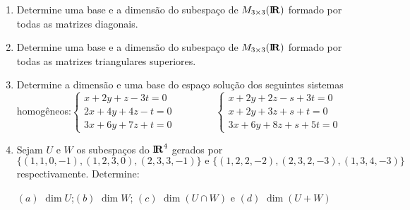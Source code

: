 \documentclass{report}
\begin{document}
\begin{Exercise}
\begin{enumerate}
\item \label{19lista3} Determine uma base e a dimens\~{a}o do
subespa\c{c}o de $M_{3\times
3}(%
\mbox{${\rm I}\!\mbox{\boldmath $ {\rm R}$}$}%
)$ formado por todas as matrizes diagonais.
%

\item \label{20lista3} Determine uma base e a dimens\~{a}o do
subespa\c{c}o de $M_{3\times
3}(%
\mbox{${\rm I}\!\mbox{\boldmath $ {\rm R}$}$}%
)$ formado por todas as matrizes triangulares superiores.


\item \label{21lista3} Determine a dimens\~{a}o e uma base do
espa\c{c}o solu\c{c}\~{a}o dos seguintes sistemas
homog\^{e}neos:\newline $\left\{
\begin{array}{l}
x+2y+z-3t=0 \\
2x+4y+4z-t=0 \\
3x+6y+7z+t=0
\end{array}
\right. \qquad \qquad \left\{
\begin{array}{l}
x+2y+2z-s+3t=0 \\
x+2y+3z+s+t=0 \\
3x+6y+8z+s+5t=0
\end{array}
\right. \quad $


\item \label{22lista3} Sejam $U$ e $W$ os subespa\c{c}os do $%
\mbox{${\rm I}\!\mbox{\boldmath $ {\rm R}$}$}%
^{4}$ gerados por
\[
\{(1,1,0,-1),(1,2,3,0),(2,3,3,-1)\}\text{ e }%
\{(1,2,2,-2),(2,3,2,-3),(1,3,4,-3)\}
\]
respectivamente. Determine:

$(a)$ $\dim U$;\quad $(b)$ $\dim W$; $(c)$ $\dim (U\cap W)$ e
$(d)$ $\dim (U+W)$


\end{enumerate}
\end{Exercise}
\end{document}
